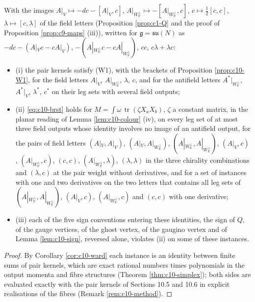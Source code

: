 \begin{proposition}
\label{prop:c10-checks}
With the images $A|_V\mapsto-dc-[A|_V,c]$, $A|_{W_{\mathbb R}^\perp}\mapsto-[A|_{W_{\mathbb R}^\perp},c]$, $c\mapsto\tfrac12[c,c]$, $\lambda\mapsto[c,\lambda]$ of the field letters (Proposition \ref{prop:c1-Q} and the proof of Proposition \ref{prop:c9-maps} (iii)), written for $\mathfrak g=\mathfrak{su}(N)$ as $-dc-(A|_Vc-cA|_V)$, $-(A|_{W_{\mathbb R}^\perp}c-cA|_{W_{\mathbb R}^\perp})$, $cc$, $c\lambda+\lambda c$:
\begin{itemize}
\item (i) the pair kernels satisfy (W1), with the brackets of Proposition \ref{prop:c10-W1}, for the field letters $A|_V$, $A|_{W_{\mathbb R}^\perp}$, $\lambda$, $c$, and for the antifield letters $A^*|_{W_{\mathbb R}^\perp}$, $A^*|_V$, $\lambda^*$, $c^*$ on their leg sets with several field outputs;
\item (ii) \eqref{eq:c10-brst} holds for $M=\int\omega\,\operatorname{tr}(\zeta X_aX_b)$, $\zeta$ a constant matrix, in the planar reading of Lemma \ref{lem:c10-colour} (iv), on every leg set of at most three field outputs whose identity involves no image of an antifield output, for the pairs of field letters $(A|_V,A|_V)$, $(A|_V,A|_{W_{\mathbb R}^\perp})$, $(A|_{W_{\mathbb R}^\perp},A|_{W_{\mathbb R}^\perp})$, $(A|_V,c)$, $(A|_{W_{\mathbb R}^\perp},c)$, $(c,c)$, $(A|_{W_{\mathbb R}^\perp},\lambda)$, $(\lambda,\lambda)$ in the three chirality combinations and $(\lambda,c)$ at the pair weight without derivatives, and for a set of instances with one and two derivatives on the two letters that contains all leg sets of $(A|_{W_{\mathbb R}^\perp},A|_{W_{\mathbb R}^\perp})$, $(A|_V,c)$, $(A|_{W_{\mathbb R}^\perp},c)$ and $(c,c)$ with one derivative;
\item (iii) each of the five sign conventions entering these identities, the sign of $Q$, of the gauge vertices, of the ghost vertex, of the gaugino vertex and of Lemma \ref{lem:c10-sign}, reversed alone, violates (ii) on some of these instances.
\end{itemize}
\end{proposition}

\begin{proof}
By Corollary \ref{cor:c10-ward} each instance is an identity between finite sums of pair kernels, which are exact rational numbers times polynomials in the output momenta and fibre structures (Theorem \ref{thm:c10-simplex}); both sides are evaluated exactly with the pair kernels of Sections 10.5 and 10.6 in explicit realisations of the fibres (Remark \ref{rem:c10-method}).
\end{proof}

